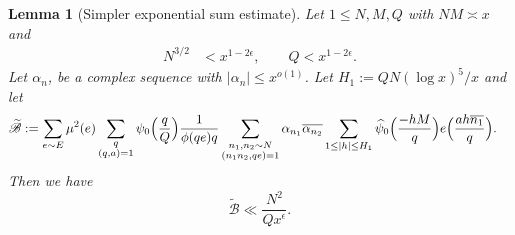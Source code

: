 \documentclass[10pt]{amsart}
\theoremstyle{plain}
\newtheorem{lmm}[thrm]{Lemma}
\numberwithin{equation}{section}
\renewcommand{\hat}[1]{\widehat #1}
\begin{document}
\begin{lmm}[Simpler exponential sum estimate]\label{lmm:BFISimple}
Let $1\le N,M,Q$ with $NM \asymp x$ and
\begin{align}
N^{3/2}&< x^{1-2\epsilon},\qquad Q< x^{1-2\epsilon}.
\end{align}
Let $\alpha_n$, be a complex sequence with $|\alpha_n|\le x^{o(1)}$. Let $H_1:=Q N(\log{x})^5/x$ and let 
\begin{align*}
\widetilde{\mathscr{B}}&:=\sum_{e\sim E}\mu^2(e)\sum_{\substack{q\\ (q,a)=1}}\psi_0\Bigl(\frac{q}{Q}\Bigr)\frac{1}{\phi(q e)q}\sum_{\substack{n_1,n_2\sim N\\ (n_1n_2,q e)=1}}\alpha_{n_1}\overline{\alpha_{n_2}}\sum_{1\le |h|\le H_1}\hat{\psi}_0\Bigl(\frac{-h M}{q}\Bigr)e\Bigl( \frac{a h \overline{ n_1}}{q}\Bigr).
\end{align*}
Then we have
\[
\widetilde{\mathscr{B}}\ll\frac{N^2}{Q x^\epsilon}.
\]
\end{lmm}
%
%
%
%
\end{document}
